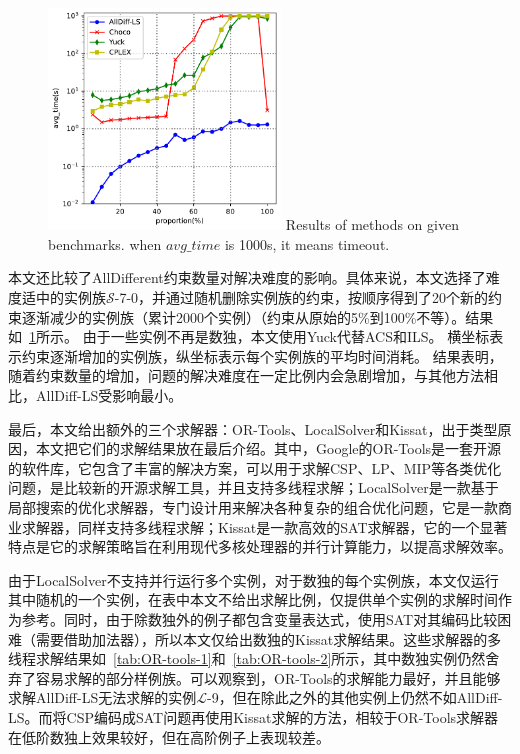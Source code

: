 \begin{figure}[t]
    \centering
    \includegraphics[width=0.55\textwidth]{Img/des.pdf}
     {Results of methods on given benchmarks. when $avg\_time$ is 1000s, it means timeout.}
    \label{fig:des}
\end{figure}

本文还比较了AllDifferent约束数量对解决难度的影响。具体来说，本文选择了难度适中的实例族$\mathcal{S}$-7-0，并通过随机删除实例族的约束，按顺序得到了20个新的约束逐渐减少的实例族（累计2000个实例）（约束从原始的5\%到100\%不等）。结果如\figurename~\ref{fig:des}所示。
由于一些实例不再是数独，本文使用Yuck代替ACS和ILS。
横坐标表示约束逐渐增加的实例族，纵坐标表示每个实例族的平均时间消耗。
结果表明，随着约束数量的增加，问题的解决难度在一定比例内会急剧增加，与其他方法相比，AllDiff-LS受影响最小。

最后，本文给出额外的三个求解器：OR-Tools、LocalSolver和Kissat，出于类型原因，本文把它们的求解结果放在最后介绍。其中，Google的OR-Tools是一套开源的软件库，它包含了丰富的解决方案，可以用于求解CSP、LP、MIP等各类优化问题，是比较新的开源求解工具，并且支持多线程求解；LocalSolver是一款基于局部搜索的优化求解器，专门设计用来解决各种复杂的组合优化问题，它是一款商业求解器，同样支持多线程求解；Kissat是一款高效的SAT求解器，它的一个显著特点是它的求解策略旨在利用现代多核处理器的并行计算能力，以提高求解效率。

由于LocalSolver不支持并行运行多个实例，对于数独的每个实例族，本文仅运行其中随机的一个实例，在表中本文不给出求解比例，仅提供单个实例的求解时间作为参考。同时，由于除数独外的例子都包含变量表达式，使用SAT对其编码比较困难（需要借助加法器），所以本文仅给出数独的Kissat求解结果。这些求解器的多线程求解结果如\tablename~\ref{tab:OR-tools-1}和\tablename~\ref{tab:OR-tools-2}所示，其中数独实例仍然舍弃了容易求解的部分样例族。可以观察到，OR-Tools的求解能力最好，并且能够求解AllDiff-LS无法求解的实例$\mathcal{L}$-9，但在除此之外的其他实例上仍然不如AllDiff-LS。而将CSP编码成SAT问题再使用Kissat求解的方法，相较于OR-Tools求解器在低阶数独上效果较好，但在高阶例子上表现较差。

